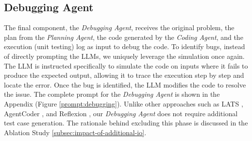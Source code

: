 \subsection{Debugging Agent}
\label{subsec:debugging-agent}

The final component, the \emph{Debugging Agent}, receives the original problem, the plan from the \emph{Planning Agent}, the code generated by the \emph{Coding Agent}, and the execution (unit testing) log as input to debug the code. To identify bugs, instead of directly prompting the LLMs, we uniquely leverage the simulation once again. The LLM is instructed specifically to simulate the code on inputs where it fails to produce the expected output, allowing it to trace the execution step by step and locate the error. Once the bug is identified, the LLM modifies the code to resolve the issue. The complete prompt for the \emph{Debugging Agent} is shown in the Appendix (Figure \ref{prompt:debugging}). Unlike other approaches such as LATS \cite{zhou2023lats}, AgentCoder \cite{huang2023agentcoder}, and Reflexion \cite{shinn2023reflexion}, our \emph{Debugging Agent} does not require additional test case generation. The rationale behind excluding this phase is discussed in the Ablation Study \ref{subsec:impact-of-additional-io}.


